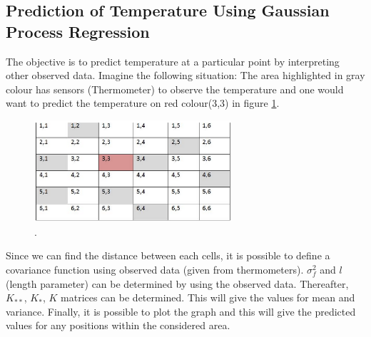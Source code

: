 \subsection{Prediction of  Temperature Using Gaussian Process Regression}
The objective is to predict temperature at a particular point by interpreting other observed data. Imagine the following situation: The area highlighted in gray colour has sensors (Thermometer) to observe the temperature and one would want  to predict the temperature on red colour(3,3) in figure \ref{fig:value-matrix}.
\begin{figure}[here]
  \centering
      \includegraphics[width=0.65\textwidth]{theory/graphics/value-matrix.png}
  \caption{ . }
  \label{fig:value-matrix}
\end{figure}
Since we can find the distance between each cells, it is possible to define a covariance function using observed data (given from thermometers). $ \sigma_{f}^{2} $ and $ l $ (length parameter) can be determined by using the observed data. Thereafter, $ K_{**} $, $ K_{*} $, $ K $ matrices can be determined. This will give the values for mean and variance. Finally, it is possible to plot the graph and this will give the predicted values for any positions within the considered area.
